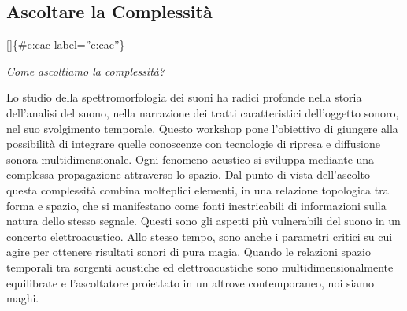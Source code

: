\documentclass[a4paper,11pt]{article}
\begin{document}
\subsection{Ascoltare la Complessità}\hypertarget{ascoltare-la-complessit}{}\label{ascoltare-la-complessit}

{[}{]}\{\#c:cac label=''c:cac''\}

\emph{Come ascoltiamo la complessità?}

Lo studio della spettromorfologia dei suoni ha radici profonde nella
storia dell'analisi del suono, nella narrazione dei tratti
caratteristici dell'oggetto sonoro, nel suo svolgimento temporale.
Questo workshop pone l'obiettivo di giungere alla possibilità di
integrare quelle conoscenze con tecnologie di ripresa e diffusione
sonora multidimensionale. Ogni fenomeno acustico si sviluppa mediante
una complessa propagazione attraverso lo spazio. Dal punto di vista
dell'ascolto questa complessità combina molteplici elementi, in una
relazione topologica tra forma e spazio, che si manifestano come fonti
inestricabili di informazioni sulla natura dello stesso segnale. Questi
sono gli aspetti più vulnerabili del suono in un concerto
elettroacustico. Allo stesso tempo, sono anche i parametri critici su
cui agire per ottenere risultati sonori di pura magia. Quando le
relazioni spazio temporali tra sorgenti acustiche ed elettroacustiche
sono multidimensionalmente equilibrate e l'ascoltatore proiettato in un
altrove contemporaneo, noi siamo maghi.
\end{document}
